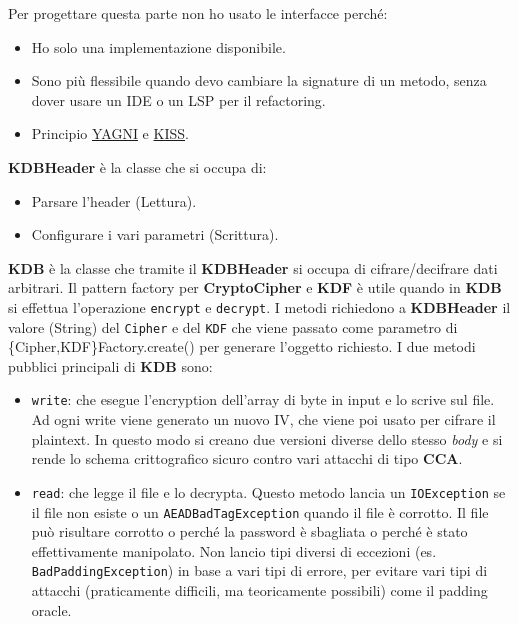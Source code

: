 \documentclass[a4paper,12pt]{report}
\begin{document}
Per progettare questa parte non ho usato le interfacce perché:
\begin{itemize}
  \item Ho solo una implementazione disponibile.
  \item Sono più flessibile quando devo cambiare la signature di un metodo, senza dover usare un IDE o un LSP per il refactoring.
  \item Principio \href{https://en.wikipedia.org/wiki/You_aren%27t_gonna_need_it}{YAGNI} e \href{https://en.wikipedia.org/wiki/KISS_principle}{KISS}.
\end{itemize}

\textbf{KDBHeader} è la classe che si occupa di:
\begin{itemize}
  \item Parsare l'header (Lettura).
  \item Configurare i vari parametri (Scrittura).
\end{itemize}

\textbf{KDB} è la classe che tramite il \textbf{KDBHeader} si occupa di cifrare/decifrare
dati arbitrari.
Il pattern factory per \textbf{CryptoCipher} e \textbf{KDF} è utile quando in \textbf{KDB}
si effettua l'operazione \texttt{encrypt} e \texttt{decrypt}. I metodi richiedono
a \textbf{KDBHeader} il valore (String) del \texttt{Cipher} e del \texttt{KDF} che viene
passato come parametro di \{Cipher,KDF\}Factory.create() per generare l'oggetto
richiesto.
I due metodi pubblici principali di \textbf{KDB} sono:
\begin{itemize}
  \item \texttt{write}: che esegue l'encryption dell'array di byte in input e lo scrive sul file.
    Ad ogni write viene generato un nuovo IV, che viene poi usato per cifrare il plaintext.
    In questo modo si creano due versioni diverse dello stesso \textit{body} e si rende
    lo schema crittografico sicuro contro vari attacchi di tipo \textbf{CCA}.
  \item \texttt{read}: che legge il file e lo decrypta. Questo metodo lancia un
    \texttt{IOException} se il file non esiste o un \texttt{AEADBadTagException} quando il file è corrotto.
    Il file può risultare corrotto o perché la password è sbagliata o perché è stato effettivamente manipolato.
    Non lancio tipi diversi di eccezioni (es. \texttt{BadPaddingException}) in base a vari tipi di errore,
    per evitare vari tipi di attacchi (praticamente difficili, ma teoricamente possibili) come
    il padding oracle.
\end{itemize}
\end{document}
